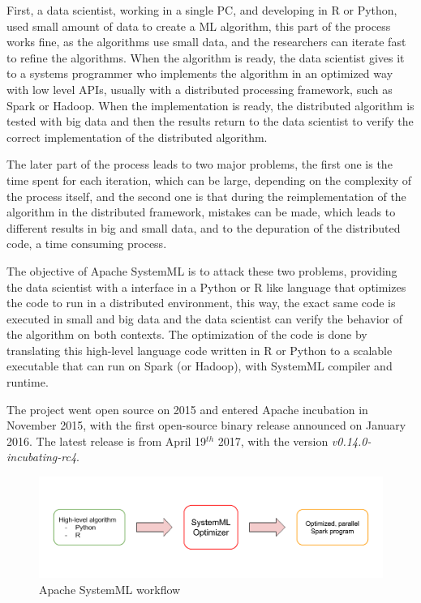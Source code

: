 \documentclass[11pt]{book} %
\begin{document}
    First, a data scientist, working in a single PC, and developing in R or Python, used small amount of data to create a ML algorithm, this part of the process works fine, as the algorithms use small data, and the researchers can iterate fast to refine the algorithms. When the algorithm is ready, the data scientist gives it to a systems programmer who implements the algorithm in an optimized way with low level APIs, usually with a distributed processing framework, such as Spark or Hadoop. When the implementation is ready, the distributed algorithm is tested with big data and then the results return to the data scientist to verify the correct implementation of the distributed algorithm.

    The later part of the process leads to two major problems, the first one is the time spent for each iteration, which can be large, depending on the complexity of the process itself, and the second one is that during the reimplementation of the algorithm in the distributed framework, mistakes can be made, which leads to different results in big and small data, and to the depuration of the distributed code, a time consuming process.

    The objective of Apache SystemML is to attack these two problems, providing the data scientist with a interface in a Python or R like language that optimizes the code to run in a distributed environment, this way, the exact same code is executed in small and big data and the data scientist can verify the behavior of the algorithm on both contexts. The optimization of the code is done by translating this high-level language code written in R or Python to a scalable executable that can run on Spark (or Hadoop), with SystemML compiler and runtime.

    The project went open source on 2015 and entered Apache incubation in November 2015, with the first open-source binary release announced on January 2016. The latest release is from April 19$^{th}$ 2017, with the version \emph{v0.14.0-incubating-rc4}.

    \begin{figure}[!ht]
      \centering
      \includegraphics[width=\textwidth]{systemml_objective.png}
      \caption{Apache SystemML workflow}
      \label{img:systemml_workflow}
    \end{figure}
\end{document}

